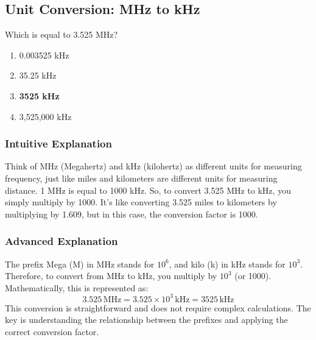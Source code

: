 \subsection{Unit Conversion: MHz to kHz}
\label{T5B07}

\begin{tcolorbox}[colback=gray!10!white,colframe=black!75!black,title=T5B07]
Which is equal to 3.525 MHz?
\begin{enumerate}[noitemsep]
    \item 0.003525 kHz
    \item 35.25 kHz
    \item \textbf{3525 kHz}
    \item 3,525,000 kHz
\end{enumerate}
\end{tcolorbox}

\subsubsection*{Intuitive Explanation}
Think of MHz (Megahertz) and kHz (kilohertz) as different units for measuring frequency, just like miles and kilometers are different units for measuring distance. 1 MHz is equal to 1000 kHz. So, to convert 3.525 MHz to kHz, you simply multiply by 1000. It's like converting 3.525 miles to kilometers by multiplying by 1.609, but in this case, the conversion factor is 1000.

\subsubsection*{Advanced Explanation}
The prefix Mega (M) in MHz stands for $10^6$, and kilo (k) in kHz stands for $10^3$. Therefore, to convert from MHz to kHz, you multiply by $10^3$ (or 1000). Mathematically, this is represented as:
\[
3.525 \, \text{MHz} = 3.525 \times 10^3 \, \text{kHz} = 3525 \, \text{kHz}
\]
This conversion is straightforward and does not require complex calculations. The key is understanding the relationship between the prefixes and applying the correct conversion factor.